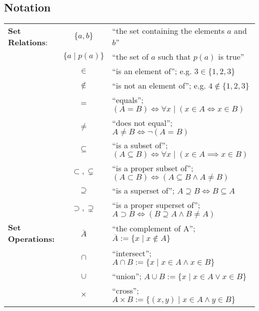 \documentclass[a4paper, 12pt]{report}
\theoremstyle{definition}
\begin{document}
\begin{doublespace}
\subsection{Notation}

\begin{tabular}{lcl}

\textbf{Set Relations}:
& \(\{a, b\}\) &
``the set containing the elements \(a\) and \(b\)''\\

& \(\{a \mid p(a)\}\) &
``the set of \(a\) such that \(p(a)\) is true''\\

& \(\in\) & ``is an element of'';
e.g. \(3 \in \{1, 2, 3\}\)\\

& \(\notin\) & ``is not an element of'';
e.g. \(4 \notin \{1, 2, 3\}\)\\

& \(=\) & ``equals'';
\((A = B) \iff \forall x \mid (x \in A \iff x \in B)\)\\

& \(\neq\) & ``does not equal''; \(A \neq B \iff \lnot (A = B)\)\\

& \(\subseteq\) & ``is a subset of'';
\((A \subseteq B) \iff \forall x \mid (x \in A \implies x \in B)\)\\

& \(\subset, \subsetneq\) & ``is a proper subset of'';
\((A \subset B) \iff (A \subseteq B \land A \neq B)\)\\

& \(\supseteq\) & ``is a superset of'';
\(A \supseteq B \iff B \subseteq A\)\\

& \(\supset, \supsetneq\) & ``is a proper superset of'';
\(A \supset B \iff (B \supseteq A \land B \neq A)\)\\

\textbf{Set Operations:}
& \(\overline{A}\) & ``the complement of A'';
\(\overline{A} := \{x \mid x \notin A\}\)\\

& \(\cap\) & ``intersect'';
\(A \cap B := \{x \mid x \in A \land x \in B\}\)\\

& \(\cup\) & ``union'';
\(A \cup B := \{x \mid x \in A \lor x \in B\}\)\\

& \(\times\) & ``cross'';
\(A \times B := \{(x, y) \mid x \in A \land y \in B\}\)\\


\end{tabular}
\end{doublespace}
\end{document}
